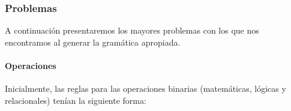



\subsubsection{Problemas}

A continuación presentaremos los mayores problemas con los que nos encontramos al generar la gramática apropiada.

\paragraph{Operaciones}
Inicialmente, las reglas para las operaciones binarias (matemáticas, lógicas y relacionales) tenían la siguiente forma:

